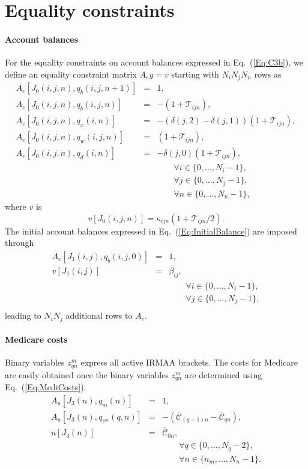 \documentclass{report}[fleqn,12pt]
\begin{document}
\section{Equality constraints}

\paragraph*{Account balances}
For the equality constraints on account balances expressed in Eq.~(\ref{Eq:C3b}),
we define an equality constraint matrix $A_ey = v$ starting
with $N_iN_jN_n$ rows as
\begin{eqnarray}
	\label{Eq:B1}
	A_e[J_0(i, j, n), q_b(i, j, n+1)] &=& 1, \nonumber \\
	A_e[J_0(i, j, n), q_b(i, j, n)] &=& -(1 + \mathcal{T}_{ijn}), \nonumber \\
	A_e[J_0(i, j, n), q_x(i, n)] &=& -(\delta(j, 2) - \delta(j, 1))(1 + \mathcal{T}_{ijn}), \nonumber \\
	A_e[J_0(i, j, n), q_w(i, j, n)] &=& (1 + \mathcal{T}_{ijn}), \nonumber \\
	A_e[J_0(i, j, n), q_d(i, n)] &=& -\delta(j, 0)(1 + \mathcal{T}_{ijn}), \\
	&&\qquad\forall i \in \{0,\ldots, N_i-1\},\nonumber\\
	&&\qquad\forall j \in \{0,\ldots, N_j-1\},\nonumber\\
	&&\qquad\forall n \in \{0,\ldots, N_n-1\}, \nonumber
\end{eqnarray}
where $v$ is
\begin{equation}
	v[J_0(i, j, n)] = \kappa_{ijn}(1 + \mathcal{T}_{ijn}/2).
\end{equation}
The initial account balances expressed in Eq.~(\ref{Eq:InitialBalance}) are imposed through
\begin{eqnarray}
	A_e[J_1(i, j), q_b(i, j, 0)] &=& 1, \nonumber \\
	v[J_1(i, j)] &=& \beta_{ij},  \\
	&&\qquad\forall i \in \{0,\ldots, N_i-1\},\nonumber\\
	&&\qquad\forall j \in \{0,\ldots, N_j-1\},\nonumber\\
\end{eqnarray}
leading to $N_i N_j$ additional rows to $A_e$.

\paragraph*{Medicare costs}
Binary variables $z_{qn}^m$ express all active IRMAA brackets.
The costs for Medicare are easily obtained once the binary variables
$z^m_{qn}$ are determined using Eq.~(\ref{Eq:MediCosts}).
\begin{eqnarray}
	A_u[J_3(n), q_{m}(n)] &=& 1, \nonumber \\
	A_u[J_3(n), q_{z^m}(q, n)] &=& -(\bar{\mathcal{C}}_{(q+1)n} - \bar{\mathcal{C}}_{qn}), \nonumber \\
	u[J_3(n)] &=& \bar{\mathcal{C}}_{0n},\\
	&&\qquad\forall q \in \{0,\ldots, N_q - 2\}, \nonumber\\
	&&\qquad\forall n \in \{n_m,\ldots, N_n - 1\}.\nonumber
\end{eqnarray}
\end{document}
